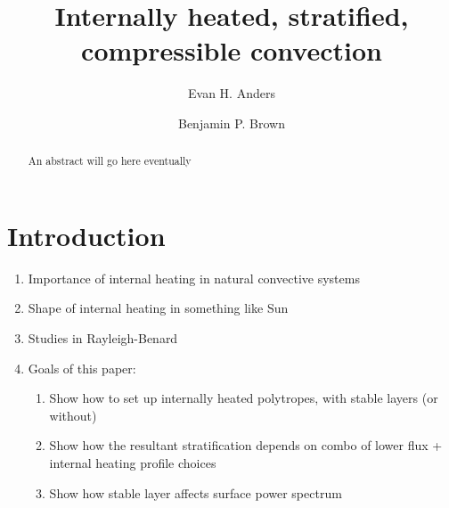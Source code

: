 \documentclass[aps, pre, onecolumn, nofootinbib, notitlepage, groupedaddress, amsfonts, amssymb, amsmath, longbibliography]{revtex4-1}
\begin{document}
\author{Evan H. Anders}
\author{Benjamin P. Brown}
\title{Internally heated, stratified, compressible convection}

\begin{abstract}
An abstract will go here eventually
\end{abstract}
\maketitle


\section{Introduction}
\label{sec:intro}
\begin{enumerate}
\item Importance of internal heating in natural convective systems
\item Shape of internal heating in something like Sun
\item Studies in Rayleigh-Benard
\item Goals of this paper:
\begin{enumerate}
\item Show how to set up internally heated polytropes, with stable layers (or without)
\item Show how the resultant stratification depends on combo of lower flux + internal heating profile choices
\item Show how stable layer affects surface power spectrum
\end{enumerate}
\end{enumerate}
\end{document}
